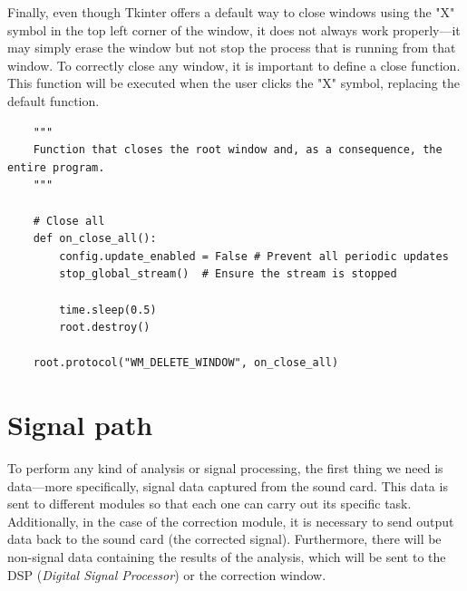 Finally, even though Tkinter offers a default way to close windows using the "X" symbol in the top left corner of the window, it does not always work properly—it may simply erase the window but not stop the process that is running from that window. To correctly close any window, it is important to define a close function. This function will be executed when the user clicks the "X" symbol, replacing the default function.

\begin{verbatim}
	"""
	Function that closes the root window and, as a consequence, the entire program.
	"""
	
	# Close all
	def on_close_all():
		config.update_enabled = False # Prevent all periodic updates
		stop_global_stream()  # Ensure the stream is stopped
	
		time.sleep(0.5)
		root.destroy()
	
	root.protocol("WM_DELETE_WINDOW", on_close_all)	
\end{verbatim}



\section{Signal path}

To perform any kind of analysis or signal processing, the first thing we need is data—more specifically, signal data captured from the sound card. This data is sent to different modules so that each one can carry out its specific task. Additionally, in the case of the correction module, it is necessary to send output data back to the sound card (the corrected signal). Furthermore, there will be non-signal data containing the results of the analysis, which will be sent to the DSP (\textit{Digital Signal Processor}) or the correction window.

